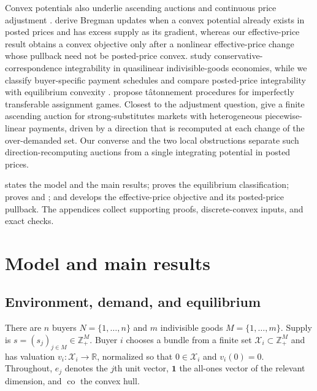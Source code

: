 \documentclass[11pt,a4paper,fleqn]{article}
\theoremstyle{plain}
\theoremstyle{definition}
\newcommand{\R}{\mathbb{R}}
\newcommand{\Z}{\mathbb{Z}}
\newcommand{\co}{\operatorname{co}}
\newcommand{\Xcal}{\mathcal{X}}
\newcommand{\one}{\mathbf{1}}
\begin{document}
Convex potentials also underlie ascending auctions and continuous price adjustment \citep{gulstacchetti2000,ausubel2006,milgromstrulovici2009,murotaetal2016,paesleme2017}. \citet{cheungcoledevanur2020} derive Bregman updates when a convex potential already exists in posted prices and has excess supply as its gradient, whereas our effective-price result obtains a convex objective only after a nonlinear effective-price change whose pullback need not be posted-price convex. \citet{bedardgoeree2025} study conservative-correspondence integrability in quasilinear indivisible-goods economies, while we classify buyer-specific payment schedules and compare posted-price integrability with equilibrium convexity \citep[see also][]{rockafellar1966,rochet1987,kushnirlokutsievskiy2021}. \citet{balkanskienfaenza2024} propose t\^atonnement procedures for imperfectly transferable assignment games. Closest to the adjustment question, \citet{okisato2026} give a finite ascending auction for strong-substitutes markets with heterogeneous piecewise-linear payments, driven by a direction that is recomputed at each change of the over-demanded set. Our converse and the two local obstructions separate such direction-recomputing auctions from a single integrating potential in posted prices.

 states the model and the main results;  proves the equilibrium classification;  proves  and ; and  develops the effective-price objective and its posted-price pullback. The appendices collect supporting proofs, discrete-convex inputs, and exact checks.

\section{Model and main results}\label{sec:model}

\subsection{Environment, demand, and equilibrium}\label{subsec:environment}

There are $n$ buyers $N=\{1,\ldots,n\}$ and $m$ indivisible goods $M=\{1,\ldots,m\}$. Supply is $s=(s_j)_{j\in M}\in\Z_+^M$. Buyer $i$ chooses a bundle from a finite set $\Xcal_i\subset\Z_+^M$ and has valuation $v_i:\Xcal_i\to\R$, normalized so that $0\in\Xcal_i$ and $v_i(0)=0$. Throughout, $e_j$ denotes the $j$th unit vector, $\one$ the all-ones vector of the relevant dimension, and $\co$ the convex hull.
\end{document}
